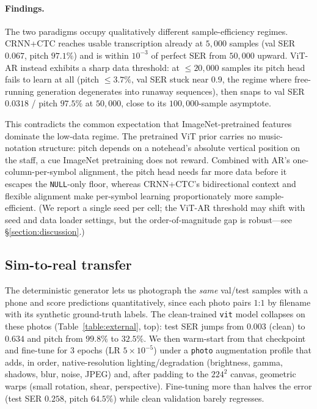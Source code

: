 \paragraph{Findings.} The two paradigms occupy qualitatively different
sample-efficiency regimes. CRNN+CTC reaches usable transcription already at
$5{,}000$ samples (val SER $0.067$, pitch $97.1\%$) and is within $10^{-3}$ of
perfect SER from $50{,}000$ upward. ViT-AR instead exhibits a sharp data
threshold: at ${\le}20{,}000$ samples its pitch head fails to learn at all (pitch
${\le}3.7\%$, val SER stuck near $0.9$, the regime where free-running generation
degenerates into runaway sequences), then snaps to val SER $0.0318$ / pitch
$97.5\%$ at $50{,}000$, close to its $100{,}000$-sample asymptote.

This contradicts the common expectation that ImageNet-pretrained features
dominate the low-data regime. The pretrained ViT prior carries no music-notation
structure: pitch depends on a notehead's absolute vertical position on the staff,
a cue ImageNet pretraining does not reward. Combined with AR's one-column-per-symbol
alignment, the pitch head needs far more data before it escapes the
\texttt{NULL}-only floor, whereas CRNN+CTC's bidirectional context and flexible
alignment make per-symbol learning proportionately more sample-efficient. (We
report a single seed per cell; the ViT-AR threshold may shift with seed and data
loader settings, but the order-of-magnitude gap is robust---see
\S\ref{section:discussion}.)

\subsection{Sim-to-real transfer}
\label{sec:exp:sim2real}

The deterministic generator lets us photograph the \emph{same} val/test samples
with a phone and score predictions quantitatively, since each photo pairs $1$:$1$
by filename with its synthetic ground-truth labels. The clean-trained \texttt{vit}
model collapses on these photos (Table~\ref{table:external}, top): test SER jumps
from $0.003$ (clean) to $0.634$ and pitch from $99.8\%$ to $32.5\%$. We then
warm-start from that checkpoint and fine-tune for $3$ epochs (LR $5\times10^{-5}$)
under a \texttt{photo} augmentation profile that adds, in order, native-resolution
lighting/degradation (brightness, gamma, shadows, blur, noise, JPEG) and, after
padding to the $224^2$ canvas, geometric warps (small rotation, shear,
perspective). Fine-tuning more than halves the error (test SER $0.258$, pitch
$64.5\%$) while clean validation barely regresses.

